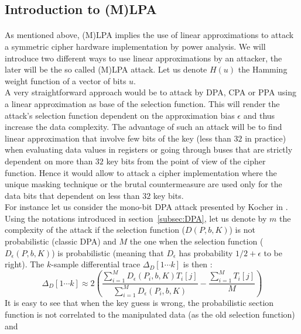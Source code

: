 \documentclass[11pt,a4paper]{article}
\begin{document}
{{{{{{{{{\subsection{Introduction to (M)LPA}
\label{subsec:IntroMLPA}
\paragraph{}
As mentioned above, (M)LPA implies the use of linear approximations to attack a symmetric cipher hardware implementation by power analysis. We will introduce two different ways to 
use linear approximations by an attacker, the later will be the so called (M)LPA attack. Let us denote $H(u)$ the Hamming weight function of a vector of bits $u$.
\vspace{1ex} \\
A very straightforward approach would be to attack by DPA, CPA or PPA using a linear approximation as base of the selection function. This will render the attack's selection function dependent on 
the approximation bias $\epsilon$ and thus increase the data complexity. The advantage of such an attack will be to find linear approximation 
that involve few bits of the key (less than $32$ in practice) when evaluating data values in registers or going through buses that are strictly dependent on more than 
$32$ key bits from the point of view of the cipher function. Hence it would allow to attack a cipher implementation where the unique masking technique or
the brutal countermeasure are used only for the data bits that dependent on less than $32$ key bits. \\
For instance let us consider the mono-bit DPA attack presented by Kocher in \cite{Kocher98}. Using the notations introduced in section~\ref{subsec:DPA}, 
let us denote by $m$ the complexity of the attack if the selection function ($D(P, b, K)$) is not probabilistic (classic DPA) and $M$ the one when the selection function ($D_{\epsilon}(P, b, K)$) 
is probabilistic (meaning that $D_{\epsilon}$ has probability $1/2+\epsilon$ to be right). The $k$-sample differential trace $\Delta_D[1\cdots k]$ is then : 
\begin{displaymath}
 \Delta_D[1\cdots k] \approx 2 \left( \frac{\sum^{M}_{i=1}D_{\epsilon}(P_i, b, K)T_i[j]}{\sum^{M}_{i=1}D_{\epsilon}(P_i, b, K)} - \frac{\sum^{M}_{i=1}T_i[j]}{M}\right)
\end{displaymath}
It is easy to see that when the key guess is wrong, the probabilistic section function is not correlated to the manipulated data (as the old selection function) and 
}}}}}}}}}
\end{document}
